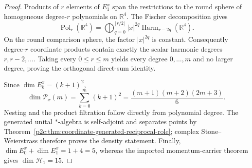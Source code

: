 \documentclass[12pt,a4paper]{article}
\begin{document}
\begin{proof}
Products of \(r\) elements of \(E_1^x\) span the restrictions to the round
sphere of homogeneous degree-\(r\) polynomials on \(\mathbb R^4\).  The
Fischer decomposition gives
\[
 \operatorname{Pol}_r(\mathbb R^4)
 =\bigoplus_{q=0}^{\lfloor r/2\rfloor}
 |x|^{2q}\operatorname{Harm}_{r-2q}(\mathbb R^4).
\]
On the round comparison sphere, the factor \(|x|^{2q}\) is constant.
Consequently degree-\(r\) coordinate products contain exactly the scalar
harmonic degrees \(r,r-2,\ldots\).  Taking every \(0\le r\le m\) yields every
degree \(0,\ldots,m\) and no larger degree, proving the orthogonal direct-sum
identity.

Since \(\dim E_k^x=(k+1)^2\),
\[
 \dim\mathcal P_x(m)
 =\sum_{k=0}^{m}(k+1)^2
 =\frac{(m+1)(m+2)(2m+3)}6.
\]
Nesting and the product filtration follow directly from polynomial degree.
The generated unital \(*\)-algebra is self-adjoint and separates points by
Theorem~\ref{p2c:thm:coordinate-generated-reciprocal-role}; complex
Stone--Weierstrass therefore proves the density statement.  Finally,
\(\dim E_0^x+\dim E_1^x=1+4=5\), whereas the imported momentum-carrier theorem
gives \(\dim\mathcal H_1=15\).
\end{proof}
\end{document}
